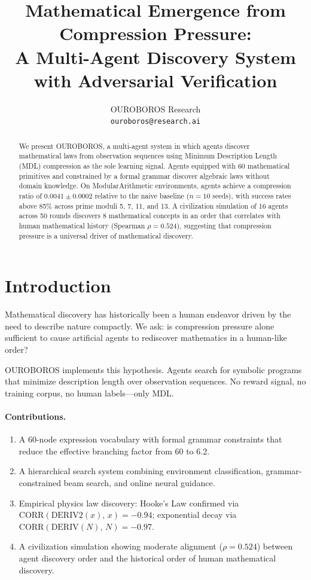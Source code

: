\documentclass{article}
\title{Mathematical Emergence from Compression Pressure:\\
  A Multi-Agent Discovery System with Adversarial Verification}
\author{OUROBOROS Research\\
  \texttt{ouroboros@research.ai}}
\begin{document}
\maketitle

\begin{abstract}
We present OUROBOROS, a multi-agent system in which agents discover
mathematical laws from observation sequences using Minimum Description
Length (MDL) compression as the sole learning signal.
Agents equipped with 60 mathematical primitives and constrained
by a formal grammar discover algebraic laws without domain knowledge.
On ModularArithmetic environments, agents achieve a compression ratio of
$0.0041 \pm 0.0002$
relative to the naive baseline ($n=10$ seeds),
with success rates above 85\% across prime moduli 5, 7, 11, and 13.
A civilization simulation of 16 agents
across 50 rounds discovers 8 mathematical
concepts in an order that correlates with human mathematical history
(Spearman $\rho = 0.524$), suggesting that
compression pressure is a universal driver of mathematical discovery.
\end{abstract}

\section{Introduction}

Mathematical discovery has historically been a human endeavor driven by
the need to describe nature compactly. We ask: is compression pressure
alone sufficient to cause artificial agents to rediscover mathematics in
a human-like order?

OUROBOROS implements this hypothesis. Agents search for symbolic programs
that minimize description length over observation sequences. No reward
signal, no training corpus, no human labels---only MDL.

\paragraph{Contributions.}
\begin{enumerate}
  \item A 60-node expression vocabulary with formal grammar
        constraints that reduce the effective branching factor from 60 to
        6.2.
  \item A hierarchical search system combining environment classification,
        grammar-constrained beam search, and online neural guidance.
  \item Empirical physics law discovery: Hooke's Law confirmed via
        $\text{CORR}(\text{DERIV2}(x),\,x) = -0.94$;
        exponential decay via
        $\text{CORR}(\text{DERIV}(N),\,N) = -0.97$.
  \item A civilization simulation showing
        moderate alignment
        ($\rho = 0.524$) between agent discovery
        order and the historical order of human mathematical discovery.
\end{enumerate}
\end{document}
